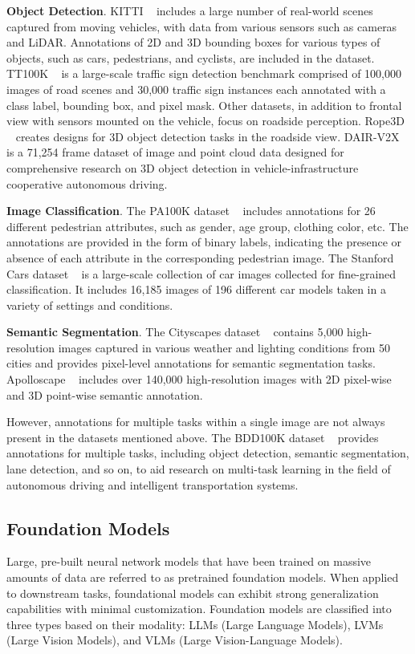\documentclass[10pt,twocolumn,letterpaper]{article}
\begin{document}
\textbf{Object Detection}. KITTI ~\cite{kitti} includes a large number of real-world scenes captured from moving vehicles, with data from various sensors such as cameras and LiDAR. Annotations of 2D and 3D bounding boxes for various types of objects, such as cars, pedestrians, and cyclists, are included in the dataset. TT100K ~\cite{tt100k} is a large-scale traffic sign detection benchmark comprised of 100,000 images of road scenes and 30,000 traffic sign instances each annotated with a class label, bounding box, and pixel mask. Other datasets, in addition to frontal view with sensors mounted on the vehicle, focus on roadside perception. Rope3D ~\cite{ye2022rope3d} creates designs for 3D object detection tasks in the roadside view. DAIR-V2X ~\cite{yu2022dair} is a 71,254 frame dataset of image and point cloud data designed for comprehensive research on 3D object detection in vehicle-infrastructure cooperative autonomous driving.

\textbf{Image Classification}. The PA100K dataset ~\cite{liu2017hydraplus} includes annotations for 26 different pedestrian attributes, such as gender, age group, clothing color, etc. The annotations are provided in the form of binary labels, indicating the presence or absence of each attribute in the corresponding pedestrian image. The Stanford Cars dataset ~\cite{KrauseStarkDengFei-Fei_3DRR2013} is a large-scale collection of car images collected for fine-grained classification. It includes 16,185 images of 196 different car models taken in a variety of settings and conditions.

\textbf{Semantic Segmentation}. The Cityscapes dataset ~\cite{Cordts2016Cityscapes} contains 5,000 high-resolution images captured in various weather and lighting conditions from 50 cities and provides pixel-level annotations for semantic segmentation tasks. Apolloscape ~\cite{ma2019trafficpredict} includes over 140,000 high-resolution images with 2D pixel-wise and 3D point-wise semantic annotation.

However, annotations for multiple tasks within a single image are not always present in the datasets mentioned above. The BDD100K dataset ~\cite{Yu2018BDD100KAD} provides annotations for multiple tasks, including object detection, semantic segmentation, lane detection, and so on, to aid research on multi-task learning in the field of autonomous driving and intelligent transportation systems.


\subsection{Foundation Models}
Large, pre-built neural network models that have been trained on massive amounts of data are referred to as pretrained foundation models. When applied to downstream tasks, foundational models can exhibit strong generalization capabilities with minimal customization. Foundation models are classified into three types based on their modality: LLMs (Large Language Models), LVMs (Large Vision Models), and VLMs (Large Vision-Language Models).
\end{document}
